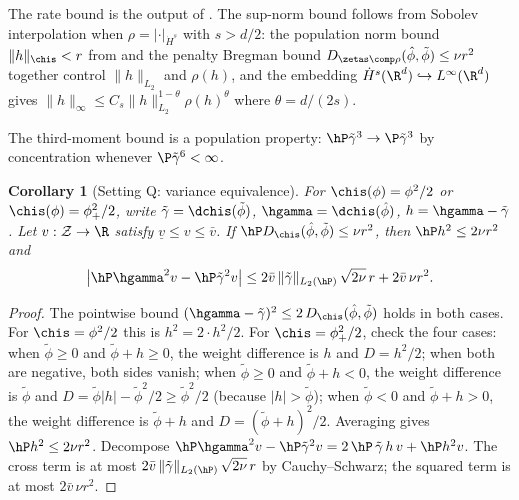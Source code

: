 \documentclass{article}
\newtheorem{corollary}[theorem]{Corollary}
\newcommand{\setupvariants}{%
  \stepcounter{theorem}%
  \xdef\variantbase{\arabic{theorem}}%
  \addtocounter{theorem}{-1}%
}
\newcommand{\theoremvariant}[1]{%
  \setcounter{theorem}{\numexpr\variantbase-1\relax}%
  \renewcommand{\thetheorem}{\thesection.\variantbase\textup{#1}}%
}
\newcommand{\resettheorem}{%
  \renewcommand{\thetheorem}{\thesection.\arabic{theorem}}%
}
\begin{document}
The rate bound is the output of . The sup-norm bound follows from Sobolev interpolation when $\rho = |\cdot|_{\dot H^s}$ with $s > d/2$: the population norm bound $\|h\|_{\chis} < r$ from  and the penalty Bregman bound $D_{\zetas \comp \rho}(\hat\phi, \tilde\phi) \le \nu r^2$ together control $\|h\|_{L_2}$ and $\rho(h)$, and the embedding $\dot H^s(\R^d) \hookrightarrow L^\infty(\R^d)$ gives $\|h\|_\infty \le C_s \|h\|_{L_2}^{1-\theta} \rho(h)^\theta$ where $\theta = d/(2s)$.

The third-moment bound is a population property: $\hP \tilde\gamma^3 \to \P \tilde\gamma^3$ by concentration whenever $\P \tilde\gamma^6 < \infty$.

\setupvariants

\theoremvariant{Q}
\begin{corollary}[Setting Q: variance equivalence]\label{cor:variance-equiv-quadratic}
For $\chis(\phi) = \phi^2/2$ or $\chis(\phi) = \phi_+^2/2$,
write $\tilde\gamma = \dchis(\tilde\phi)$,
$\hgamma = \dchis(\hat\phi)$,
$h = \hgamma - \tilde\gamma$.
Let $v: \mathcal{Z} \to \R$ satisfy $\underline{v} \le v \le \bar{v}$.
If $\hP D_{\chis}(\hat\phi, \tilde\phi) \le \nu r^2$,
then $\hP h^2 \le 2\nu r^2$ and
\begin{equation}\label{eq:variance-equiv-quadratic}
\abs{\hP \hgamma^2 v - \hP \tilde\gamma^2 v}
  \le 2\bar{v}\, \|\tilde\gamma\|_{L_2(\hP)}\, \sqrt{2\nu}\, r
  + 2\bar{v}\, \nu r^2.
\end{equation}
\end{corollary}

\begin{proof}
The pointwise bound
$(\hgamma - \tilde\gamma)^2
  \le 2\, D_{\chis}(\hat\phi, \tilde\phi)$
holds in both cases.
For $\chis = \phi^2/2$
this is $h^2 = 2 \cdot h^2/2$.
For $\chis = \phi_+^2/2$,
check the four cases:
when $\tilde\phi \ge 0$ and $\tilde\phi + h \ge 0$,
the weight difference is $h$
and $D = h^2/2$;
when both are negative,
both sides vanish;
when $\tilde\phi \ge 0$
and $\tilde\phi + h < 0$,
the weight difference is $\tilde\phi$
and $D = \tilde\phi|h| - \tilde\phi^2/2
  \ge \tilde\phi^2/2$
(because $|h| > \tilde\phi$);
when $\tilde\phi < 0$
and $\tilde\phi + h > 0$,
the weight difference is $\tilde\phi + h$
and $D = (\tilde\phi + h)^2/2$.
Averaging gives
$\hP h^2 \le 2\nu r^2$.
Decompose
$\hP \hgamma^2 v - \hP \tilde\gamma^2 v
  = 2\,\hP\,\tilde\gamma\, h\, v
  + \hP h^2 v$.
The cross term is at most
$2\bar{v}\, \|\tilde\gamma\|_{L_2(\hP)}\, \sqrt{2\nu}\, r$
by Cauchy--Schwarz;
the squared term is at most
$2\bar{v}\, \nu r^2$.
\end{proof}
\resettheorem
\end{document}
